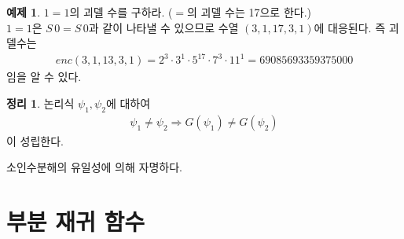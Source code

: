 \documentclass[b5paper, 10pt]{book}
\theoremstyle{definition}
\newtheorem{thm}[defn]{정리}
\newtheorem{ex}[defn]{예제}
\newenvironment{pf*}{\pushQED{\qed}\pf}{\popQED\endpf}
\begin{document}
\begin{ex}
    $1 = 1$의 괴델 수를 구하라. ($=$의 괴델 수는 17으로 한다.) \\ 
    $1 = 1$은 $S\, 0 = S\, 0$과 같이 나타낼 수 있으므로 수열 $(3, 1, 17, 3, 1)$에 대응된다. 즉
    괴델수는 
    \begin{align*}
        enc(3, 1, 13, 3, 1) = 2^3 \cdot 3^1 \cdot 5^{17} \cdot 7^3 \cdot 11^1 = 69085693359375000
    \end{align*}
    임을 알 수 있다.
\end{ex}
\begin{thm}
    논리식 $\psi_1, \psi_2$에 대하여
    \begin{align*}
        \psi_1 \neq \psi_2 \Rightarrow G(\psi_1) \neq G(\psi_2)
    \end{align*}
    이 성립한다. 
\end{thm}
\begin{pf*}
    소인수분해의 유일성에 의해 자명하다.
\end{pf*}
\section{부분 재귀 함수}
\end{document}
